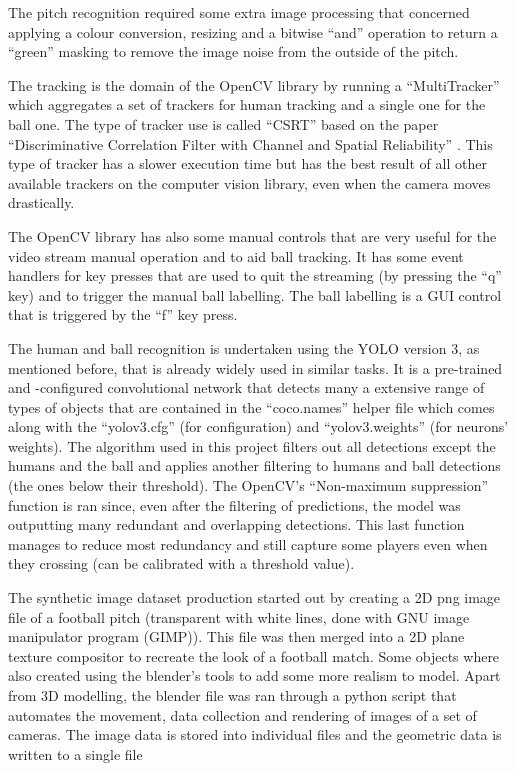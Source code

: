 \documentclass[
    11pt,
    oneside
]{report}
\begin{document}
The pitch recognition required some extra image processing that concerned applying a colour conversion, resizing and a bitwise ``and'' operation to return a ``green'' masking to remove the image noise from the outside of the pitch.


The tracking is the domain of the OpenCV \cite{opencv} library by running a ``MultiTracker'' which aggregates a set of trackers for human tracking and a single one for the ball one. The type of tracker use is called ``CSRT'' based on the paper ``Discriminative Correlation Filter with Channel and Spatial Reliability'' \cite{csrt}. This type of tracker has a slower execution time but has the best result of all other available trackers on the computer vision library, even when the camera moves drastically.


The OpenCV \cite{opencv} library has also some manual controls that are very useful for the video stream manual operation and to aid ball tracking. It has some event handlers for key presses that are used to quit the streaming (by pressing the ``q'' key) and to trigger the manual ball labelling. The ball labelling is a GUI control that is triggered by the ``f'' key press.


The human and ball recognition is undertaken using the YOLO \cite{yolo} version 3, as mentioned before, that is already widely used in similar tasks. It is a pre-trained and -configured convolutional network that detects many a extensive range of types of objects that are contained in the ``coco.names'' helper file which comes along with the ``yolov3.cfg'' (for configuration) and ``yolov3.weights'' (for neurons' weights). The algorithm used in this project filters out all detections except the humans and the ball and applies another filtering to humans and ball detections (the ones below their threshold). The OpenCV's \cite{opencv} ``Non-maximum suppression'' \cite{nms} function is ran since, even after the filtering of predictions, the model was outputting many redundant and overlapping detections. This last function manages to reduce most redundancy and still capture some players even when they crossing (can be calibrated with a threshold value).


The synthetic image dataset production started out by creating a 2D png image file of a football pitch (transparent with white lines, done with GNU image manipulator program (GIMP)). This file was then merged into a 2D plane texture compositor to recreate the look of a football match. Some objects where also created using the blender's tools to add some more realism to model. Apart from 3D modelling, the blender file was ran through a python script that automates the movement, data collection and rendering of images of a set of cameras. The image data is stored into individual files and the geometric data is written to a single file
\end{document}
